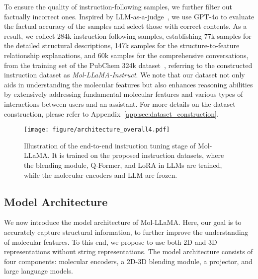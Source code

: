 \vspace{-0.07in}
To ensure the quality of instruction-following samples, we further filter out factually incorrect ones. Inspired by LLM-as-a-judge~\cite{zheng2023llmasajudge}, we use GPT-4o to evaluate the factual accuracy of the samples and select those with correct contents. As a result, we collect 284k instruction-following samples, establishing 77k samples for the detailed structural descriptions, 147k samples for the structure-to-feature relationship explanations, and 60k samples for the comprehensive conversations, from the training set of the PubChem 324k dataset~\cite{li2024molm}, referring to the constructed instruction dataset as \textit{Mol-LLaMA-Instruct}. We note that our dataset not only aids in understanding the molecular features but also enhances reasoning abilities by extensively addressing fundamental molecular features and various types of interactions between users and an assistant. For more details on the dataset construction, please refer to Appendix~\ref{app:sec:dataset_construction}.

% 


\begin{figure*}[ht]
    \centering
    \texttt{[image: figure/architecture\_overall4.pdf]}
    \vspace{-0.3in}
    \caption{\small Illustration of the end-to-end instruction tuning stage of Mol-LLaMA. It is trained on the proposed instruction datasets, where the blending module, Q-Former, and LoRA in LLMs are trained, while the molecular encoders and LLM are frozen.}
    \label{fig:blending_module}
    \vspace{-0.1in}
\end{figure*}

\vspace{-0.05in}
\subsection{Model Architecture}
\vspace{-0.05in}
We now introduce the model architecture of Mol-LLaMA. Here, our goal is to accurately capture structural information, to further improve the understanding of molecular features. To this end, we propose to use both 2D and 3D representations without string representations. The model architecture consists of four components: molecular encoders, a 2D-3D blending module, a projector, and large language models.

\vspace{-0.05in}
